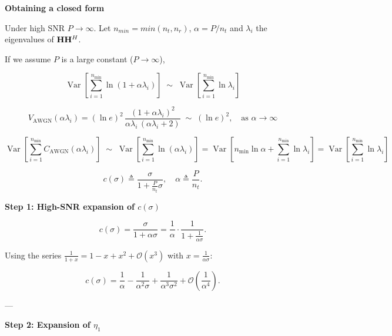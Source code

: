 \documentclass[a4paper, 12pt, onecolumn, journal, twoside, draftclsnofoot]{IEEEtran}
\begin{document}
\textbf{Obtaining a closed form}

Under high SNR $P \to \infty$. Let $n_{min} = min(n_t,n_r)$, $\alpha = P/n_t$ and $\lambda_i$ the eigenvalues of ${\bf H} {\bf H}^H$.

If we assume $P$ is a large constant ($P \to \infty$), 

\begin{equation*}
\operatorname{Var}\!\left[\sum_{i=1}^{n_{\min}} \ln\!\left(1+\alpha \lambda_i\right)\right]
\;\sim\;
\operatorname{Var}\!\left[\sum_{i=1}^{n_{\min}} \ln \lambda_i \right]
\end{equation*}

\begin{equation*}
V_{\mathrm{AWGN}}(\alpha \lambda_i) 
= (\ln e)^{2} \, \frac{(1+\alpha \lambda_i)^{2}}{\alpha \lambda_i \, (\alpha \lambda_i + 2)}
\;\sim\; (\ln e)^{2}, \quad \text{as } \alpha \to \infty
\end{equation*}

\begin{equation*}
\operatorname{Var}\!\left[\sum_{i=1}^{n_{\min}} C_{\mathrm{AWGN}}(\alpha \lambda_i)\right]
\;\sim\;
\operatorname{Var}\!\left[\sum_{i=1}^{n_{\min}} \ln(\alpha \lambda_i)\right]
= \operatorname{Var}\!\left[n_{\min}\ln \alpha + \sum_{i=1}^{n_{\min}} \ln \lambda_i\right]
= \operatorname{Var}\!\left[\sum_{i=1}^{n_{\min}} \ln \lambda_i\right]
\end{equation*}

\begin{equation*}
c(\sigma) \triangleq \frac{\sigma}{1+\frac{P}{n_t}\sigma}, 
\quad \alpha \triangleq \frac{P}{n_t}.
\end{equation*}

\textbf{Step 1: High-SNR expansion of $c(\sigma)$}

\begin{equation*}
c(\sigma) = \frac{\sigma}{1+\alpha\sigma} 
= \frac{1}{\alpha}\cdot \frac{1}{1+\tfrac{1}{\alpha\sigma}}.
\end{equation*}

Using the series $\tfrac{1}{1+x} = 1 - x + x^2 + \mathcal{O}(x^3)$ with $x=\tfrac{1}{\alpha\sigma}$:

\begin{equation*}
c(\sigma) = \frac{1}{\alpha} - \frac{1}{\alpha^2\sigma} 
+ \frac{1}{\alpha^3\sigma^2} + \mathcal{O}\!\left(\frac{1}{\alpha^4}\right).
\end{equation*}

---

\textbf{Step 2: Expansion of $\eta_1$}
\end{document}
